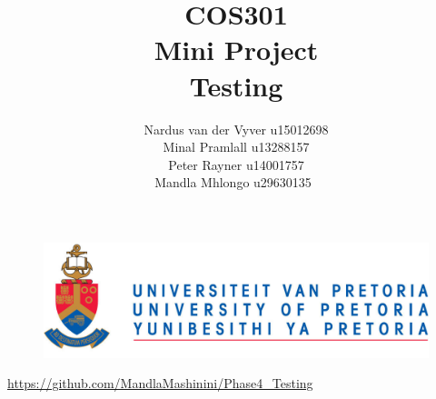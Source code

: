 \documentclass[12pt]{article}
\begin{document}
	

	\begin{figure}
		\includegraphics[width=\linewidth]{logo.jpg}	
	\end{figure}

	\title 	{
				COS301\\
				Mini Project\\
				Testing
		   	}
	\author {
				Nardus van der Vyver u15012698\\
				Minal Pramlall u13288157\\
				Peter Rayner u14001757\\
				Mandla Mhlongo u29630135\
			}
	\maketitle
	\begin{center}
			\url{https://github.com/MandlaMashinini/Phase4_Testing}	
	\end{center}
	\newpage
	\tableofcontents
	\newpage
\end{document}
